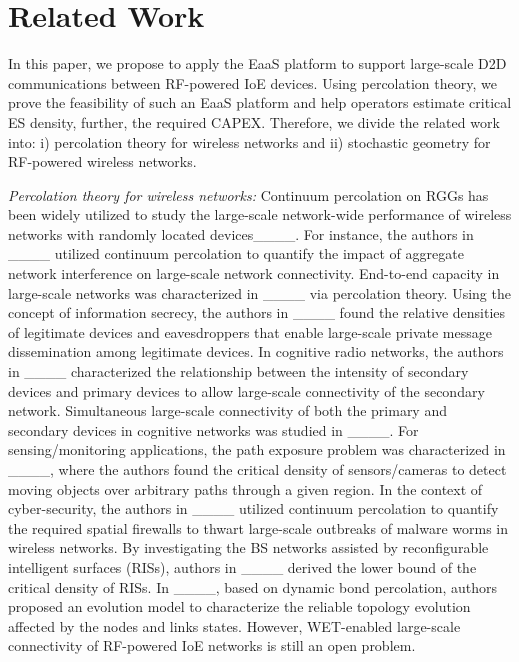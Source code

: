 \section{Related Work}
In this paper, we propose to apply the EaaS platform to support large-scale D2D communications between RF-powered IoE devices. Using percolation theory, we prove the feasibility of such an EaaS platform and help operators estimate critical ES density, further, the required CAPEX. Therefore, we divide the related work into: i) percolation theory for wireless networks and ii) stochastic geometry for RF-powered wireless networks.


\indent \textit{Percolation theory for wireless networks:} Continuum percolation on RGGs has been widely utilized to study the large-scale network-wide performance of wireless networks with randomly located devices____. For instance, the authors in ____ utilized continuum percolation to quantify the impact of aggregate network interference on large-scale network connectivity. End-to-end capacity in large-scale networks was characterized in ____ via percolation theory. Using the concept of information secrecy, the authors in ____ found the relative densities of legitimate devices and eavesdroppers that enable large-scale private message dissemination among legitimate devices. In cognitive radio networks, the authors in ____ characterized the relationship between the intensity of secondary devices and primary devices to allow large-scale connectivity of the secondary network. Simultaneous large-scale connectivity of both the primary and secondary devices in cognitive networks was studied in ____. For sensing/monitoring applications, the path exposure problem was characterized in ____, where the authors found the critical density of sensors/cameras to detect moving objects over arbitrary paths through a given region. In the context of cyber-security, the authors in ____ utilized continuum percolation to quantify the required spatial firewalls to thwart large-scale outbreaks of malware worms in wireless networks. By investigating the BS networks assisted by reconfigurable intelligent surfaces (RISs), authors in ____ derived the lower bound of the critical density of RISs. In ____, based on dynamic bond percolation, authors proposed an evolution model to characterize the reliable topology evolution affected by the nodes and links states. However, WET-enabled large-scale connectivity of RF-powered IoE networks is still an open problem.\\
